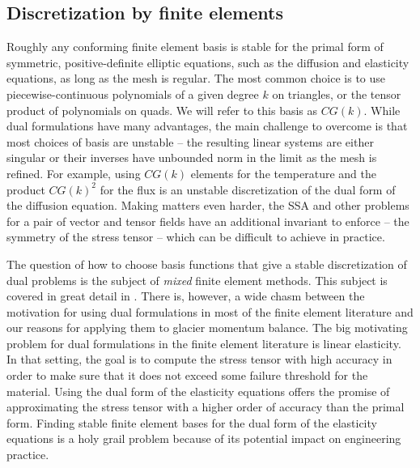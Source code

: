 \documentclass[review,oneside]{igs}
\begin{document}
\subsection{Discretization by finite elements}
\label{app:discretization}

Roughly any conforming finite element basis is stable for the primal form of symmetric, positive-definite elliptic equations, such as the diffusion and elasticity equations, as long as the mesh is regular.
The most common choice is to use piecewise-continuous polynomials of a given degree $k$ on triangles, or the tensor product of polynomials on quads.
We will refer to this basis as $CG(k)$.
While dual formulations have many advantages, the main challenge to overcome is that most choices of basis are unstable -- the resulting linear systems are either singular or their inverses have unbounded norm in the limit as the mesh is refined.
For example, using $CG(k)$ elements for the temperature and the product $CG(k)^2$ for the flux is an unstable discretization of the dual form of the diffusion equation.
Making matters even harder, the SSA and other problems for a pair of vector and tensor fields have an additional invariant to enforce -- the symmetry of the stress tensor -- which can be difficult to achieve in practice.

The question of how to choose basis functions that give a stable discretization of dual problems is the subject of \emph{mixed} finite element methods.
This subject is covered in great detail in \citet{boffi2013mixed}.
There is, however, a wide chasm between the motivation for using dual formulations in most of the finite element literature and our reasons for applying them to glacier momentum balance.
The big motivating problem for dual formulations in the finite element literature is linear elasticity.
In that setting, the goal is to compute the stress tensor with high accuracy in order to make sure that it does not exceed some failure threshold for the material.
Using the dual form of the elasticity equations offers the promise of approximating the stress tensor with a higher order of accuracy than the primal form.
Finding stable finite element bases for the dual form of the elasticity equations is a holy grail problem because of its potential impact on engineering practice.
\end{document}
